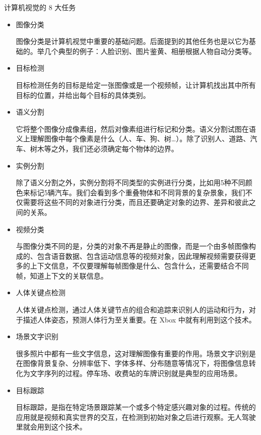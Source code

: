 \documentclass{article}
\begin{document}
计算机视觉的 8 大任务
\begin{itemize}
    
    \item 图像分类
    
    图像分类是计算机视觉中重要的基础问题。后面提到的其他任务也是以它为基础的。举几个典型的例子：人脸识别、图片鉴黄、相册根据人物自动分类等。

 
    \item 目标检测
    
    目标检测任务的目标是给定一张图像或是一个视频帧，让计算机找出其中所有目标的位置，并给出每个目标的具体类别。


    \item 语义分割
    
    它将整个图像分成像素组，然后对像素组进行标记和分类。语义分割试图在语义上理解图像中每个像素是什么（人、车、狗、树…）。除了识别人、道路、汽车、树木等之外，我们还必须确定每个物体的边界。
    
    
    \item 实例分割
    
    除了语义分割之外，实例分割将不同类型的实例进行分类，比如用5种不同颜色来标记5辆汽车。我们会看到多个重叠物体和不同背景的复杂景象，我们不仅需要将这些不同的对象进行分类，而且还要确定对象的边界、差异和彼此之间的关系。
    
    
    \item 视频分类
    
    与图像分类不同的是，分类的对象不再是静止的图像，而是一个由多帧图像构成的、包含语音数据、包含运动信息等的视频对象，因此理解视频需要获得更多的上下文信息，不仅要理解每帧图像是什么、包含什么，还需要结合不同帧，知道上下文的关联信息。
    
    
    \item 人体关键点检测
    
    人体关键点检测，通过人体关键节点的组合和追踪来识别人的运动和行为，对于描述人体姿态，预测人体行为至关重要。在 Xbox 中就有利用到这个技术。
    
    
    \item 场景文字识别
    
    很多照片中都有一些文字信息，这对理解图像有重要的作用。场景文字识别是在图像背景复杂、分辨率低下、字体多样、分布随意等情况下，将图像信息转化为文字序列的过程。停车场、收费站的车牌识别就是典型的应用场景。
    
    
    \item 目标跟踪
    
    目标跟踪，是指在特定场景跟踪某一个或多个特定感兴趣对象的过程。传统的应用就是视频和真实世界的交互，在检测到初始对象之后进行观察。无人驾驶里就会用到这个技术。
\end{itemize}
\end{document}
